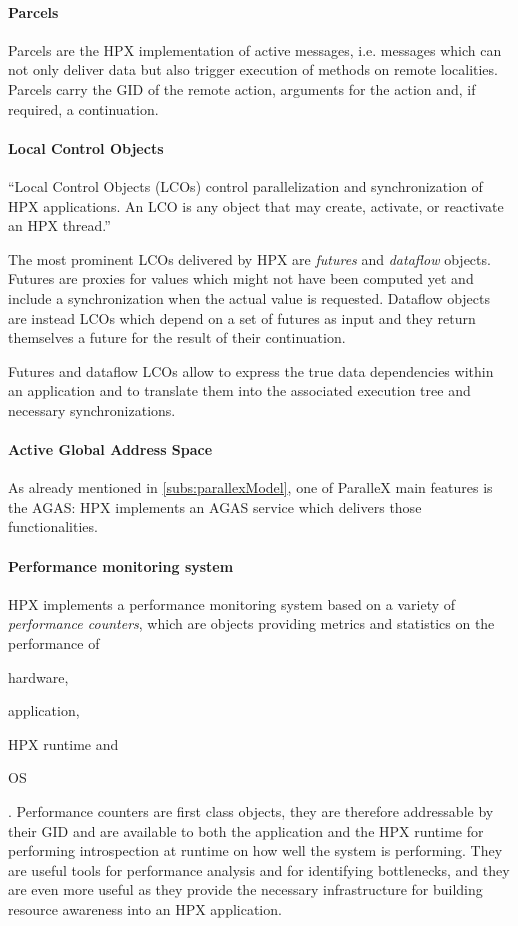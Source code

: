 \paragraph{Parcels}
Parcels are the HPX implementation of active messages, i.e. messages which can not only deliver data but also trigger execution of methods on remote localities.
Parcels carry the GID of the remote action, arguments for the action and, if required, a continuation.

\paragraph{Local Control Objects}
``Local Control Objects (LCOs) control parallelization and synchronization of
HPX applications. An LCO is any object that may create, activate, or reactivate
an HPX thread.''\cite{grubel2016dynamic}

The most prominent LCOs delivered by HPX are \emph{futures} and \emph{dataflow} objects. Futures are proxies for values which might not have been computed yet and include a synchronization when the actual value is requested. Dataflow objects are instead LCOs which depend on a set of futures as input and they return themselves a future for the result of their continuation.

Futures and dataflow LCOs allow to express the true data dependencies within an application and to translate them into the associated execution tree and necessary synchronizations.

\paragraph{Active Global Address Space}
As already mentioned in \ref{subs:parallexModel}, one of ParalleX main features is the AGAS: HPX implements an AGAS service which delivers those functionalities.

\paragraph{Performance monitoring system}
HPX implements a performance monitoring system based on a variety of \emph{performance counters}, which are objects providing metrics and statistics on the performance of
\begin{enumerate*}[label={(\roman*)}]
	\item hardware,
	\item application,
	\item HPX runtime and
	\item OS
\end{enumerate*}.
Performance counters are first class objects, they are therefore addressable by their GID and are available to both the application and the HPX runtime for performing introspection at runtime on how well the system is performing.\cite{kaiser2014hpx}
They are useful tools for performance analysis and for identifying bottlenecks, and they are even more useful as they provide the necessary infrastructure for building resource awareness into an HPX application.

